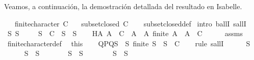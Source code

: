\begin{isabellebody}
\begin{isamarkuptext}
  Veamos, a continuación, la demostración detallada del resultado en Isabelle.%
\end{isamarkuptext}\isamarkuptrue%
\isamarkupfalse%
\isanewline
\ \ \ {\isachardoublequoteopen}finite{\isacharunderscore}character\ C{\isachardoublequoteclose}\isanewline
\ \ \ {\isachardoublequoteopen}subset{\isacharunderscore}closed\ C{\isachardoublequoteclose}\isanewline
%
\isadelimproof
\ \ %
\endisadelimproof
%
\isatagproof
{}\isamarkupfalse%
\ subset{\isacharunderscore}closed{\isacharunderscore}def\isanewline
{}\isamarkupfalse%
\ {\isacharparenleft}intro\ ballI\ sallI{\isacharparenright}\isanewline
\ \ \isamarkupfalse%
\ S{\isacharprime}\ S\isanewline
\ \ \isamarkupfalse%
\ \ {\isacartoucheopen}S\ {\isasymin}\ C{\isacartoucheclose}\ \ {\isacartoucheopen}S{\isacharprime}\ {\isasymsubseteq}\ S{\isacartoucheclose}\isanewline
\ \ \isamarkupfalse%
\ H{\isacharcolon}{\isachardoublequoteopen}{\isasymforall}A{\isachardot}\ A\ {\isasymin}\ C\ {\isasymlongleftrightarrow}\ {\isacharparenleft}{\isasymforall}A{\isacharprime}\ {\isasymsubseteq}\ A{\isachardot}\ finite\ A{\isacharprime}\ {\isasymlongrightarrow}\ A{\isacharprime}\ {\isasymin}\ C{\isacharparenright}{\isachardoublequoteclose}\isanewline
\ \ \ \ \isamarkupfalse%
\ assms\ \isamarkupfalse%
\ finite{\isacharunderscore}character{\isacharunderscore}def\ \isamarkupfalse%
\ this\isanewline
\ \ \isamarkupfalse%
\ QPQ{\isacharcolon}{\isachardoublequoteopen}{\isasymforall}S{\isacharprime}{\isacharprime}\ {\isasymsubseteq}\ S{\isacharprime}{\isachardot}\ finite\ S{\isacharprime}{\isacharprime}\ {\isasymlongrightarrow}\ S{\isacharprime}{\isacharprime}\ {\isasymin}\ C{\isachardoublequoteclose}\isanewline
\ \ \isamarkupfalse%
\ {\isacharparenleft}rule\ sallI{\isacharparenright}\isanewline
\ \ \ \ \isamarkupfalse%
\ S{\isacharprime}{\isacharprime}\isanewline
\ \ \ \ \isamarkupfalse%
\ {\isachardoublequoteopen}S{\isacharprime}{\isacharprime}\ {\isasymsubseteq}\ S{\isacharprime}{\isachardoublequoteclose}\isanewline
\ \ \ \ \isamarkupfalse%
\ \isamarkupfalse%
\ {\isachardoublequoteopen}S{\isacharprime}{\isacharprime}\ {\isasymsubseteq}\ S{\isachardoublequoteclose}\isanewline
\ \ \ \ \ \ \isamarkupfalse%
\ {\isacartoucheopen}S{\isacharprime}\ {\isasymsubseteq}\ S{\isacartoucheclose}\ \isamarkupfalse%

\end{isabellebody}

